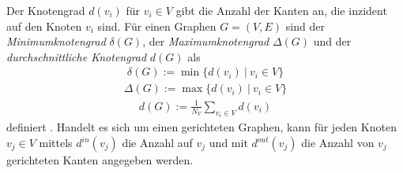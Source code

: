 \documentclass[12pt, a4paper]{report}
\begin{document}
Der Knotengrad $d(v_i)$ für $v_i \in V$ gibt die Anzahl der Kanten an, die inzident auf den Knoten $v_i$ sind. Für einen Graphen $G=(V,E)$ sind der \textit{Minimumknotengrad} $\delta(G)$, der \textit{Maximumknotengrad} $\Delta(G)$ und der \textit{durchschnittliche Knotengrad} $d(G)$ als
\begin{align}
\delta(G):=\min\{d(v_i) \ | \ v_i \in V\}
\end{align}
\begin{align}
\Delta(G):=\max\{d(v_i) \ | \ v_i \in V\}
\end{align}
\begin{align}
d(G):=\frac{1}{N_V}\sum_{v_i \in V}d(v_i)
\end{align}
definiert \cite{diestel2006graph}. Handelt es sich um einen gerichteten Graphen, kann für jeden Knoten $v_j \in V$ mittels $d^{in}(v_j)$ die Anzahl auf $v_j$ und mit $d^{out}(v_j)$ die Anzahl von $v_j$ gerichteten Kanten angegeben werden.\\
\end{document}
